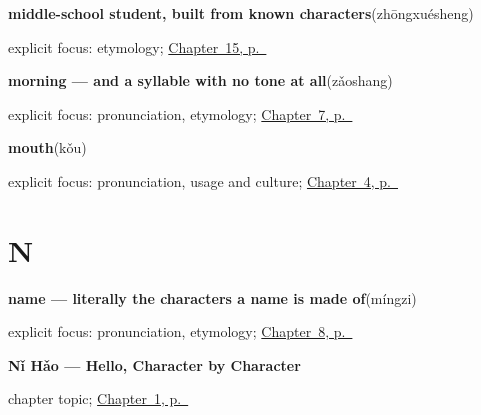 \noindent\begin{minipage}[t]{\linewidth}
\raggedright
\textbf{middle-school student, built from known characters}\enspace\emph{}\enspace(zhōngxuésheng)\par
\footnotesize explicit focus: etymology; \hyperref[ch:zh-school-compounds]{Chapter~15, p.~\pageref*{ch:zh-school-compounds}}
\end{minipage}\par\smallskip

\noindent\begin{minipage}[t]{\linewidth}
\raggedright
\textbf{morning — and a syllable with no tone at all}\enspace\emph{}\enspace(zǎoshang)\par
\footnotesize explicit focus: pronunciation, etymology; \hyperref[ch:zh-zaoshang]{Chapter~7, p.~\pageref*{ch:zh-zaoshang}}
\end{minipage}\par\smallskip

\noindent\begin{minipage}[t]{\linewidth}
\raggedright
\textbf{mouth}\enspace\emph{}\enspace(kǒu)\par
\footnotesize explicit focus: pronunciation, usage and culture; \hyperref[ch:zh-negation]{Chapter~4, p.~\pageref*{ch:zh-negation}}
\end{minipage}\par\smallskip

\section*{N}

\noindent\begin{minipage}[t]{\linewidth}
\raggedright
\textbf{name — literally the characters a name is made of}\enspace\emph{}\enspace(míngzi)\par
\footnotesize explicit focus: pronunciation, etymology; \hyperref[ch:zh-mingzi]{Chapter~8, p.~\pageref*{ch:zh-mingzi}}
\end{minipage}\par\smallskip

\noindent\begin{minipage}[t]{\linewidth}
\raggedright
\textbf{Nǐ Hǎo — Hello, Character by Character}\par
\footnotesize chapter topic; \hyperref[ch:zh-nihao]{Chapter~1, p.~\pageref*{ch:zh-nihao}}
\end{minipage}\par\smallskip

